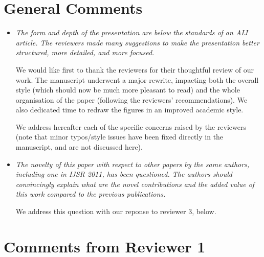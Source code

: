 \documentclass{article}
\begin{document}
\section{General Comments}

\begin{itemize}

    \item \emph{The form and depth of the presentation are below the standards of an
AIJ article.  The reviewers made many suggestions to make the presentation
better structured, more detailed, and more focused.}

We would like first to thank the reviewers for their thoughtful review of our
work. The manuscript underwent a major rewrite, impacting both the overall style
(which should now be much more pleasant to read) and the whole organisation of
the paper (following the reviewers' recommendations). We also dedicated time to
redraw the figures in an improved academic style.

We address hereafter each of the specific concerns raised by the reviewers (note
that minor typos/style issues have been fixed directly in the manuscript, and
are not discussed here).


\item \emph{The novelty of this paper with respect to other papers by the same
authors, including one in IJSR 2011, has been questioned. The authors should
convincingly explain what are the novel contributions and the added value of
this work compared to the previous publications.}

We address this question with our reponse to reviewer 3, below.

\end{itemize}

\section{Comments from Reviewer 1}
\end{document}
